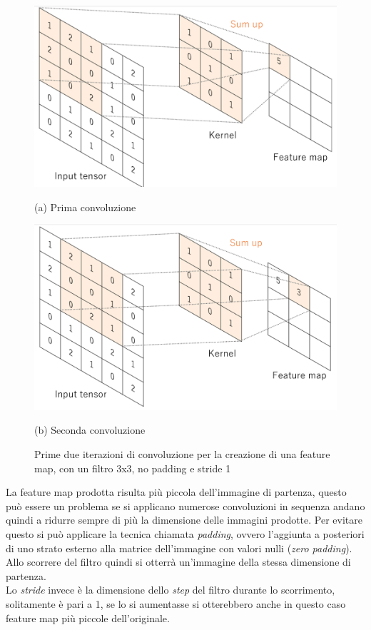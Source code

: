 \documentclass[12pt,a4paper,openright,twoside]{report}
\begin{document}
\begin{figure}[h]
\begin{minipage}[t]{0.49\linewidth}
\centering
\includegraphics[width=\linewidth]{filtera.png}

(a) Prima convoluzione  
\end{minipage}%
\hfill\vrule\hfill
\begin{minipage}[t]{0.49\linewidth}
\centering
\includegraphics[width=\linewidth]{filterb.png}

(b) Seconda convoluzione
\end{minipage}
\caption{Prime due iterazioni di convoluzione per la creazione di una feature map, con un filtro 3x3, no padding e stride 1}
\end{figure}
La feature map prodotta risulta più piccola dell'immagine di partenza, questo può essere un problema se si applicano numerose convoluzioni in sequenza andano quindi a ridurre sempre di più la dimensione delle immagini prodotte. Per evitare questo si può applicare la tecnica chiamata \emph{padding}, ovvero l'aggiunta a  posteriori di uno strato esterno alla matrice dell'immagine con valori nulli (\emph{zero padding}). Allo scorrere del filtro quindi si otterrà un'immagine della stessa dimensione di partenza.\\
Lo \emph{stride} invece è la dimensione dello \emph{step} del filtro durante lo scorrimento, solitamente è pari a 1, se lo si aumentasse si otterebbero anche in questo caso feature map più piccole dell'originale.
\end{document}
